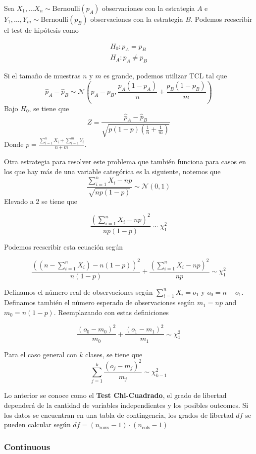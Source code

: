 Sea $X_1 , \dots X_n \sim \text{Bernoulli}(p_A)$ observaciones con la estrategia $A$ e $Y_1, \dots, Y_m \sim \text{Bernoulli}(p_B)$ observaciones con la estrategia $B$. Podemos reescribir el test de hipótesis como 

\begin{equation*}
\begin{aligned}
    H_0: p_A = p_B \\ 
    H_A: p_A \neq p_B
\end{aligned}
\end{equation*}

Si el tamaño de muestras $n$ y $m$ es grande, podemos utilizar TCL tal que 
$$
\hat{p}_A - \hat{p}_B \sim \mathcal{N} \left ( p_A - p_B , \frac{p_A(1-p_A)}{n} + \frac{p_B(1-p_B)}{m} \right )
$$
Bajo $H_0$, se tiene que 
$$
Z = \frac{\hat{p}_A - \hat{p}_B}{\sqrt{p(1-p)\left ( \frac{1}{n} + \frac{1}{m} \right )}}
$$
Donde $p = \frac{\sum_{i=1}^n X_i + \sum_{i=1}^m Y_i}{n + m}$.

Otra estrategia para resolver este problema que también funciona para casos en los que hay más de una variable categórica es la siguiente, notemos que 
$$
\frac{\sum_{i=1}^{n}X_i - np}{\sqrt{np(1-p)}} \sim \mathcal{N}(0, 1)
$$
Elevado a 2 se tiene que 

$$ \frac{(\sum_{i=1}^{n}X_i - np)^2}{np(1-p)} \sim \chi^2_{1}$$

Podemos reescribir esta ecuación según 

$$ \frac{((n-\sum_{i=1}^n X_i) - n(1-p))^2}{n(1-p)} + \frac{(\sum_{i=1}^n X_i - np)^2}{np} \sim \chi^2_{1}$$

Definamos el número real de observaciones según $\sum_{i=1}^n X_i = o_1$ y $o_0 = n - o_1$. Definamos también el número esperado de observaciones según $m_1 = np$ and $m_0 = n(1-p)$. Reemplazando con estas definiciones

$$ \frac{(o_0 - m_0)^2}{m_0} + \frac{(o_1 - m_1)^2}{m_1} \sim \chi^2_{1} $$ 

Para el caso general con $k$ clases, se tiene que 
$$ \sum_{j=1}^{k}\frac{(o_j - m_j)^2}{m_j} \sim \chi^2_{k-1}$$ 

Lo anterior se conoce como el \textbf{Test Chi-Cuadrado}, el grado de libertad dependerá de la cantidad de variables independientes y los posibles outcomes. Si los datos se encuentran en una tabla de contingencia, los grados de libertad $df$ se pueden calcular según $df = (n_{\text{rows}} - 1)\cdot (n_{\text{cols}} - 1)$


\subsubsection{Continuous}

